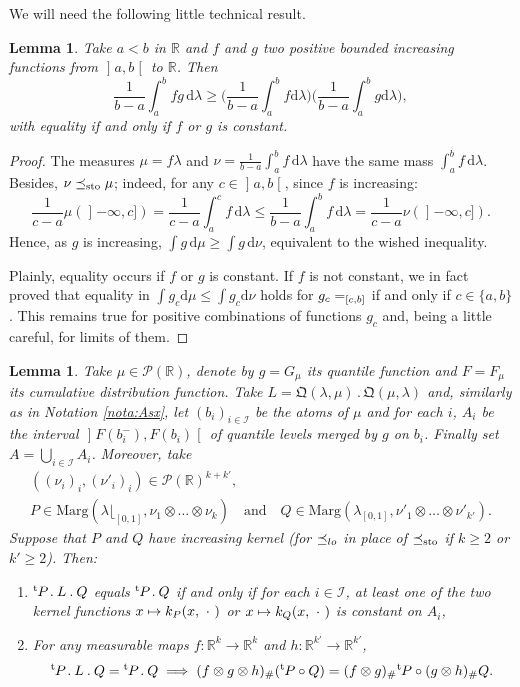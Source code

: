\documentclass[11pt]{article}
\makeatletter
\newcommand{\ldot}{\mathbin{.}}
\newcommand\mto{\mathchoice{\longmapsto}{\mapsto}{\mapsto}{\mapsto}}
\DeclareRobustCommand{\mathbbm}[1]{\csname jepbb@#1\endcsname}
\theoremstyle{plain}
\newtheorem{lem}[them]{Lemma}
\theoremstyle{definition}
\newcommand{\dd}{\mathrm{d}}
\newcommand{\como}{\mathfrak{Q}}
\newcommand{\one}{\mathbbm{1}}
\newcommand{\trans}{{}^{\mathrm{t}}\mkern-1mu}
\newcommand{\la}{\lambda}
\newcommand{\p}{\mathcal{P}}
\newcommand{\ma}{\mathrm{Marg}}
\newcommand{\R}{\mathbb{R}}
\newcommand{\AND}{\quad\text{and}\quad}
\newcommand{\leqs}{\preceq_{\text{\rm sto}}}
\newcommand{\op}{\mathopen}
\newcommand{\clo}{\mathclose}
\newcommand{\leqlc}{\preceq_{\rm lo}}
\makeatother
\begin{document}
We will need the following little technical result.

\begin{lem}\label{lem:int_fg}Take $a<b$ in $\R$ and $f$ and $g$ two positive bounded increasing functions from $\op]a,b\clo[$ to $\R$. Then
\[
\frac1{b-a}\int_a^b fg\,\dd\la\geq \biggl(\frac1{b-a}\int_a^b f\dd\la\biggr)\biggl(\frac1{b-a}\int_a^b g\dd\la\biggr),
\]
with equality if and only if $f$ or $g$ is constant.
\end{lem}

\begin{proof} The %
measures $\mu=f\la$ and $\nu=\frac1{b-a}\int_a^b f\,\dd\la$ have the same mass $\int_a^b f\,\dd\la$. Besides, $\nu\leqs\mu$; indeed, for any $c\in\op]a,b\clo[$, since $f$ is increasing:
\[\frac1{c-a}\mu(\op]-\infty,c])=\frac1{c-a}\int_{a}^c f\,\dd\la\leq\frac1{b-a}\int_{a}^b f\,\dd\la=\frac1{c-a}\nu(\op]-\infty,c]).\]
Hence, as $g$ is increasing, $\int g\,\dd\mu\geq\int g\,\dd\nu$, equivalent to the wished inequality.

Plainly, equality occurs if $f$ or $g$ is constant. If $f$ is not constant, we in fact proved that equality in $\int g_c \dd \mu\leq \int g_c \dd \nu$ holds for $g_c=\one_{[c,b]}$ if and only if $c\in\{a,b\}$. This remains true for positive combinations of functions $g_c$ and, being a little careful, for limits of them.
\end{proof}

\begin{lem}\label{lem:distributivite} Take $\mu\!\in\!\p(\R)$, denote by $g\!=\!G_\mu$ its quantile function and \hbox{$F\!=\!F_\mu$} its cumulative distribution function. Take $L=\como(\la,\mu)\ldot\como(\mu,\la)$ and, similarly as in Nota\-tion \ref{nota:Asx}, let $(b_i)_{i\in{\mathcal{I}}}$ be the atoms of $\mu$ and for each $i$, $A_i$ be the interval $\op]F(b_i^-),F(b_i)\clo[$ of quantile levels merged by $g$ on $b_i$. Finally set $A=\bigcup_{i\in\mathcal{I}}A_i$. Moreover, take\vspace*{-3pt}
\begin{gather*}
((\nu_i)_i,(\nu'_i)_i)\in\p(\R)^{k+k'},\\
P\in \ma(\la\lfloor_{[0,1]},\nu_1\otimes\ldots\otimes\nu_k)\AND Q\in\ma(\la_{[0,1]},\nu'_1\otimes\ldots\otimes\nu'_{k'}).
\end{gather*}
Suppose that $P$ and $Q$ have increasing kernel (for $\leqlc$ in place of $\leqs$ if $k\geq 2$ or $k'\geq2$). Then:
\begin{enumerate}
\item
\label{item:lem:distributiviteA} $\trans P\ldot L\ldot Q$ equals $\trans P\ldot Q$ if and only if for each $i\in{\mathcal I}$, at least one of the two kernel functions $x\mto k_P(x,\ \cdot\ )$ or $x\mto k_Q(x,\ \cdot\ )$ is constant on $A_i$,

\item
\label{item:lem:distributiviteB} For any measurable maps $f:\R^k\to\R^k$ and $h:\R^{k'}\to\R^{k'}$,
\[
\trans P\ldot L\ldot Q=\trans P\ldot Q\implies (f\otimes g \otimes h)_\#(\trans P\circ Q)=(f\otimes g)_\#\trans P\circ (g \otimes h)_\#Q.
\]
\end{enumerate}
\end{lem}
\end{document}
